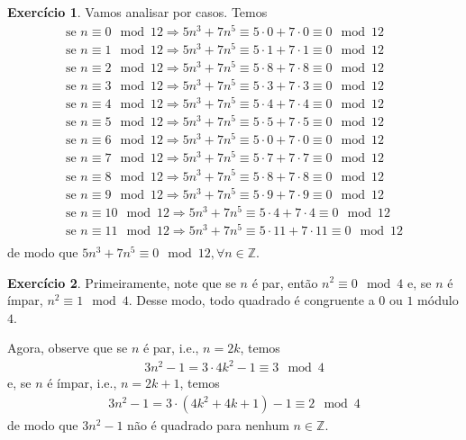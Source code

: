 \documentclass[a4paper,12pt]{article}
\theoremstyle{definition}
\newtheorem{exercise}{Exercício}%
\begin{document}
	\begin{exercise}
		Vamos analisar por casos. Temos
		\begin{align*}
		\text{se } n\equiv 0\mod 12 \Rightarrow 5n^3 + 7n^5 \equiv 5\cdot 0 + 7\cdot 0 \equiv 0 \mod 12 \\
		\text{se } n\equiv 1\mod 12 \Rightarrow 5n^3 + 7n^5 \equiv 5\cdot 1 + 7\cdot 1 \equiv 0 \mod 12 \\
		\text{se } n\equiv 2\mod 12 \Rightarrow 5n^3 + 7n^5 \equiv 5\cdot 8 + 7\cdot 8 \equiv 0 \mod 12 \\
		\text{se } n\equiv 3\mod 12 \Rightarrow 5n^3 + 7n^5 \equiv 5\cdot 3 + 7\cdot 3 \equiv 0 \mod 12 \\
		\text{se } n\equiv 4\mod 12 \Rightarrow 5n^3 + 7n^5 \equiv 5\cdot 4 + 7\cdot 4 \equiv 0 \mod 12 \\
		\text{se } n\equiv 5\mod 12 \Rightarrow 5n^3 + 7n^5 \equiv 5\cdot 5 + 7\cdot 5 \equiv 0 \mod 12 \\
		\text{se } n\equiv 6\mod 12 \Rightarrow 5n^3 + 7n^5 \equiv 5\cdot 0 + 7\cdot 0 \equiv 0 \mod 12 \\
		\text{se } n\equiv 7\mod 12 \Rightarrow 5n^3 + 7n^5 \equiv 5\cdot 7 + 7\cdot 7 \equiv 0 \mod 12 \\
		\text{se } n\equiv 8\mod 12 \Rightarrow 5n^3 + 7n^5 \equiv 5\cdot 8 + 7\cdot 8 \equiv 0 \mod 12 \\
		\text{se } n\equiv 9\mod 12 \Rightarrow 5n^3 + 7n^5 \equiv 5\cdot 9 + 7\cdot 9 \equiv 0 \mod 12 \\
		\text{se } n\equiv 10\mod 12 \Rightarrow 5n^3 + 7n^5 \equiv 5\cdot 4 + 7\cdot 4 \equiv 0 \mod 12 \\
		\text{se } n\equiv 11\mod 12 \Rightarrow 5n^3 + 7n^5 \equiv 5\cdot 11 + 7\cdot 11 \equiv 0 \mod 12 \\
		\end{align*}
		de modo que $5n^3 + 7n^5\equiv 0\mod 12, \forall n\in\mathbb{Z}$.
	\end{exercise}
	\begin{exercise}
		Primeiramente, note que se $n$ é par, então $n^2 \equiv 0\mod 4$ e, se $n$ é ímpar, $n^2 \equiv 1\mod 4$. Desse modo, todo quadrado é congruente a $0$ ou $1$ módulo $4$.
		\par\vspace{0.3cm} Agora, observe que se $n$ é par, i.e., $n = 2k$, temos
		\begin{align*}
		3n^2 - 1 = 3\cdot 4k^2 - 1 \equiv 3\mod 4
		\end{align*}
		e, se $n$ é ímpar, i.e., $n = 2k + 1$, temos
		\begin{align*}
		3n^2 - 1 = 3\cdot (4k^2 + 4k + 1) - 1 \equiv 2\mod 4
		\end{align*}
		de modo que $3n^2 - 1$ não é quadrado para nenhum $n\in\mathbb{Z}$.
	\end{exercise}
\end{document}
